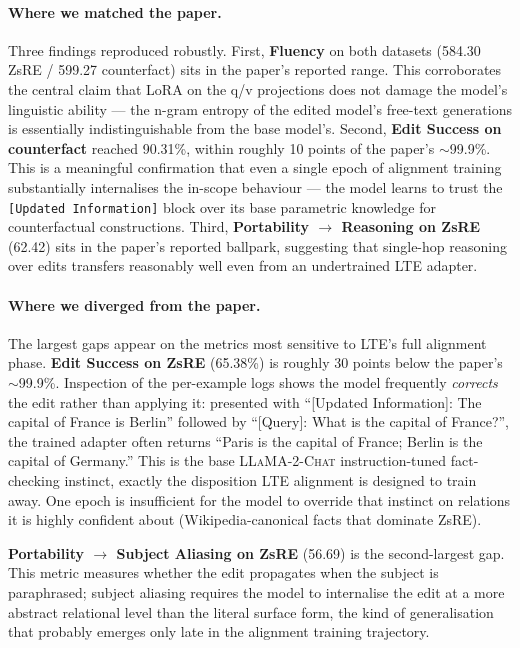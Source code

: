 \documentclass[11pt,a4paper,twocolumn]{article}
\begin{document}
\paragraph{Where we matched the paper.} Three findings reproduced robustly. First, \textbf{Fluency} on both datasets (584.30 ZsRE / 599.27 counterfact) sits in the paper's reported range. This corroborates the central claim that LoRA on the q/v projections does not damage the model's linguistic ability --- the n-gram entropy of the edited model's free-text generations is essentially indistinguishable from the base model's. Second, \textbf{Edit Success on counterfact} reached 90.31\%, within roughly 10 points of the paper's $\sim$99.9\%. This is a meaningful confirmation that even a single epoch of alignment training substantially internalises the in-scope behaviour --- the model learns to trust the \texttt{[Updated Information]} block over its base parametric knowledge for counterfactual constructions. Third, \textbf{Portability $\rightarrow$ Reasoning on ZsRE} (62.42) sits in the paper's reported ballpark, suggesting that single-hop reasoning over edits transfers reasonably well even from an undertrained LTE adapter.

\paragraph{Where we diverged from the paper.} The largest gaps appear on the metrics most sensitive to LTE's full alignment phase. \textbf{Edit Success on ZsRE} (65.38\%) is roughly 30 points below the paper's $\sim$99.9\%. Inspection of the per-example logs shows the model frequently \emph{corrects} the edit rather than applying it: presented with ``[Updated Information]: The capital of France is Berlin'' followed by ``[Query]: What is the capital of France?'', the trained adapter often returns ``Paris is the capital of France; Berlin is the capital of Germany.'' This is the base \textsc{LLaMA-2-Chat} instruction-tuned fact-checking instinct, exactly the disposition LTE alignment is designed to train away. One epoch is insufficient for the model to override that instinct on relations it is highly confident about (Wikipedia-canonical facts that dominate ZsRE).

\textbf{Portability $\rightarrow$ Subject Aliasing on ZsRE} (56.69) is the second-largest gap. This metric measures whether the edit propagates when the subject is paraphrased; subject aliasing requires the model to internalise the edit at a more abstract relational level than the literal surface form, the kind of generalisation that probably emerges only late in the alignment training trajectory.
\end{document}
